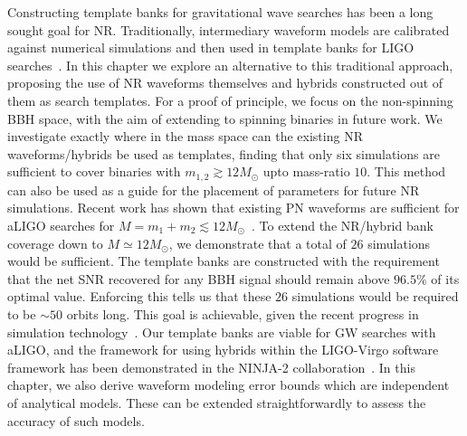 Constructing template banks for gravitational wave searches has
been a long sought goal for NR. Traditionally, intermediary waveform
models are calibrated against numerical simulations and then
used in template banks for LIGO searches~\cite{Abadie:2011kd,
Aasi:2012rja}. In this chapter we explore an alternative to this
traditional approach, proposing the use of NR waveforms themselves
and hybrids constructed out of them as search templates.
For a proof of principle, we focus on the non-spinning BBH space, 
with the aim of extending to spinning binaries in future work. We
investigate exactly where in the mass space can the existing NR 
waveforms/hybrids be used as templates, finding that only six 
simulations are sufficient to cover binaries with 
$m_{1,2}\gtrsim 12M_\odot$ upto mass-ratio $10$. This method can
also be used as a guide for the placement of parameters for future
NR simulations. Recent work has shown that existing PN waveforms 
are sufficient for aLIGO searches for 
$M=m_1+m_2\lesssim 12M_\odot$~\cite{CompTemplates2009,Brown:2012nn}.
To extend the NR/hybrid bank coverage down to 
$M\simeq 12M_\odot$, we demonstrate that a total of $26$ 
simulations would be sufficient. The template banks are 
constructed with the requirement that the net SNR recovered for 
any BBH signal should remain above $96.5\%$ of its optimal value.
Enforcing this tells us that these $26$ simulations would be 
required to be $\sim 50$ orbits long. This goal is achievable,
given the recent progress in simulation 
technology~\cite{MacDonald:2012mp,Mroue:2013xna,BelaLongSimulation}. 
Our template banks are viable for GW searches with aLIGO, and the 
framework for using hybrids within the LIGO-Virgo software 
framework has been demonstrated in the NINJA-2
collaboration~\cite{NINJA2:2013inPrep}. In this chapter, we also 
derive waveform modeling error bounds which are independent of
analytical models. These can be extended straightforwardly to 
assess the accuracy of such models.


